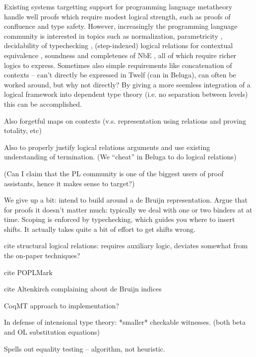 \documentclass{article}
\begin{document}
Existing systems targetting support for programming language
  metatheory handle well proofs which require modest logical
  strength, such as proofs of confluence and type safety. However,
  increasingly the programming language community is interested in
  topics such as normalization, parametricity \citep{Reynolds,morerecent?}, decidability of
  typechecking \citep{Coquand?}, (step-indexed) logical relations for contextual
  equivalence \citep{Dreyer11,others}, soundness and completenes of
  NbE \citep{Dybjer00,Abel07}, all of which require
  richer logics to express. Sometimes also simple requirements like
  concatenation of contexts -- can't directly be expressed in Twelf
  (can in Beluga), can often be worked around, but why not directly? 
  By giving a more seemless integration of a logical framework
  into dependent type theory (i.e. no separation between levels) this
  can be accomplished.

Also forgetful maps on contexts (v.s. representation using relations
and proving totality, etc)

Also to properly justify logical relations arguments and use existing
understanding of termination. (We ``cheat'' in Beluga to do logical relations)

(Can I claim that the PL community is one of the biggest users of
proof assistants, hence it makes sense to target?)

We give up a bit: intend to build around a de Bruijn
representation. Argue that for proofs it doesn't matter much:
typically we deal with one or two binders at at time. Scoping is
enforced by typechecking, which guides you where to insert
shifts. It actually takes quite a bit of effort to get shifts wrong.

cite structural logical relations: requires auxiliary logic, deviates
somewhat from the on-paper techniques? \citep{Schurmann08}

cite POPLMark \cite{POPLMark}

cite Altenkirch complaining about de Bruijn indices

CoqMT approach to implementation?

In defense of intensional type theory: *smaller* checkable
witnesses. (both beta and OL substitution equations)

Spells out equality testing -- algorithm, not heuristic.
\end{document}
